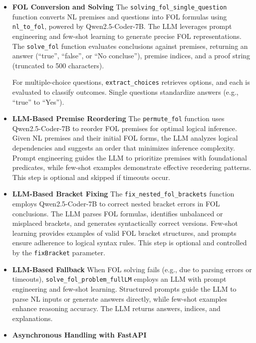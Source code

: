 \documentclass[11pt]{article}
\begin{document}
\begin{itemize}
\item 
\textbf{FOL Conversion and Solving}
The \texttt{solving\_fol\_single\_question} function converts NL premises and questions into FOL formulas using \texttt{nl\_to\_fol}, powered by Qwen2.5-Coder-7B. The LLM leverages prompt engineering and few-shot learning to generate precise FOL representations. The \texttt{solve\_fol} function evaluates conclusions against premises, returning an answer (``true'', ``false'', or ``No concluse''), premise indices, and a proof string (truncated to 500 characters).

For multiple-choice questions, \texttt{extract\_choices} retrieves options, and each is evaluated to classify outcomes. Single questions standardize answers (e.g., ``true'' to ``Yes'').
\item 
\textbf{LLM-Based Premise Reordering}
The \texttt{permute\_fol} function uses Qwen2.5-Coder-7B to reorder FOL premises for optimal logical inference. Given NL premises and their initial FOL forms, the LLM analyzes logical dependencies and suggests an order that minimizes inference complexity. Prompt engineering guides the LLM to prioritize premises with foundational predicates, while few-shot examples demonstrate effective reordering patterns. This step is optional and skipped if timeouts occur.
\item 
\textbf{LLM-Based Bracket Fixing}
The \texttt{fix\_nested\_fol\_brackets} function employs Qwen2.5-Coder-7B to correct nested bracket errors in FOL conclusions. The LLM parses FOL formulas, identifies unbalanced or misplaced brackets, and generates syntactically correct versions. Few-shot learning provides examples of valid FOL bracket structures, and prompts ensure adherence to logical syntax rules. This step is optional and controlled by the \texttt{fixBracket} parameter.
\item 
\textbf{LLM-Based Fallback}
When FOL solving fails (e.g., due to parsing errors or timeouts), \texttt{solve\_fol\_problem\_fullLM} employs an LLM with prompt engineering and few-shot learning. Structured prompts guide the LLM to parse NL inputs or generate answers directly, while few-shot examples enhance reasoning accuracy. The LLM returns answers, indices, and explanations.
\item 
\textbf{Asynchronous Handling with FastAPI}

\end{itemize}
\end{document}
